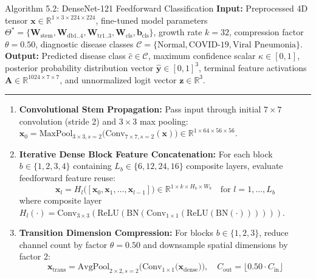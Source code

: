 \documentclass[12pt,a4paper]{report}
\begin{document}
\begin{algoBox}{Algorithm 5.2: DenseNet-121 Feedforward Classification}
\label{algo:densenet_inference}
\textbf{Input:} Preprocessed 4D tensor $\mathbf{x} \in \mathbb{R}^{1 \times 3 \times 224 \times 224}$, fine-tuned model parameters $\Theta^* = \{\mathbf{W}_{\text{stem}}, \mathbf{W}_{\text{db1..4}}, \mathbf{W}_{\text{tr1..3}}, \mathbf{W}_{\text{cls}}, \mathbf{b}_{\text{cls}}\}$, growth rate $k=32$, compression factor $\theta=0.50$, diagnostic disease classes $\mathcal{C} = \{\text{Normal}, \text{COVID-19}, \text{Viral Pneumonia}\}$.\\
\textbf{Output:} Predicted disease class $\hat{c} \in \mathcal{C}$, maximum confidence scalar $\kappa \in [0, 1]$, posterior probability distribution vector $\hat{\mathbf{y}} \in [0, 1]^3$, terminal feature activations $\mathbf{A} \in \mathbb{R}^{1024 \times 7 \times 7}$, and unnormalized logit vector $\mathbf{z} \in \mathbb{R}^3$.\\[-6pt]
\noindent\rule{\linewidth}{0.4pt}
\begin{enumerate}[1:]
  \item \textbf{Convolutional Stem Propagation:} Pass input through initial $7\times 7$ convolution (stride 2) and $3\times 3$ max pooling: $\mathbf{x}_0 = \mathrm{MaxPool}_{3\times 3, s=2}\Big(\mathrm{Conv}_{7\times 7, s=2}(\mathbf{x})\Big) \in \mathbb{R}^{1 \times 64 \times 56 \times 56}$.
  \item \textbf{Iterative Dense Block Feature Concatenation:} For each block $b \in \{1, 2, 3, 4\}$ containing $L_b \in \{6, 12, 24, 16\}$ composite layers, evaluate feedforward feature reuse:
    \begin{equation*}
      \mathbf{x}_l = H_l\big([\mathbf{x}_0, \mathbf{x}_1, \dots, \mathbf{x}_{l-1}]\big) \in \mathbb{R}^{1 \times k \times H_b \times W_b} \quad \text{for } l = 1, \dots, L_b
    \end{equation*}
    where composite layer $H_l(\cdot) = \mathrm{Conv}_{3\times 3}(\mathrm{ReLU}(\mathrm{BN}(\mathrm{Conv}_{1\times 1}(\mathrm{ReLU}(\mathrm{BN}(\cdot))))))$.
  \item \textbf{Transition Dimension Compression:} For blocks $b \in \{1, 2, 3\}$, reduce channel count by factor $\theta = 0.50$ and downsample spatial dimensions by factor 2:
    \begin{equation*}
      \mathbf{x}_{\text{trans}} = \mathrm{AvgPool}_{2\times 2, s=2}\Big(\mathrm{Conv}_{1\times 1}\big(\mathbf{x}_{\text{dense}}\big)\Big), \quad C_{\text{out}} = \lfloor 0.50 \cdot C_{\text{in}} \rfloor

\end{equation*}
\end{enumerate}
\end{algoBox}
\end{document}
